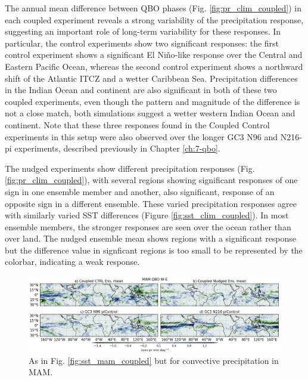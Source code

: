 The annual mean difference between QBO phases (Fig. \ref{fig:pr_clim_coupled}) in each coupled experiment reveals a strong variability of the precipitation response, suggesting an important role of long-term variability for these responses. 
In particular, the control experiments show two significant responses: the first control experiment shows a significant El Niño-like response over the Central and Eastern Pacific Ocean, whereas the second control experiment shows a northward shift of the Atlantic ITCZ and a wetter Caribbean Sea.
Precipitation differences in the Indian Ocean and continent are also significant in both of these two coupled experiments, even though the pattern and magnitude of the difference is not a close match, both simulations suggest a wetter western Indian Ocean and continent. 
Note that these three responses found in the Coupled Control experiments in this setup were also observed over the longer GC3 N96 and N216-pi experiments, described previously in Chapter \ref{ch:7-qbo}.

The nudged experiments show different precipitation responses (Fig. \ref{fig:pr_clim_coupled}), with several regions showing significant responses of one sign in one ensemble member and another, also significant, response of an opposite sign in a different ensemble. These varied precipitation responses agree with similarly varied SST differences (Figure \ref{fig:sst_clim_coupled}). In most ensemble members, the stronger responses are seen over the ocean rather than over land.
The nudged ensemble mean shows regions with a significant response but the difference value in signficant regions is too small to be represented by the colorbar, indicating a weak response. 

\begin{figure}[t!]
\centering
 \includegraphics[width=\linewidth]{figures/conv_prseasonal_mamqbowqboe.png}
\caption[ Convective precipitation response in MAM]{As in Fig. \ref{fig:sst_mam_coupled} but for convective precipitation in MAM.}
\label{fig:conv_pr_mam_coupled}
\end{figure}

